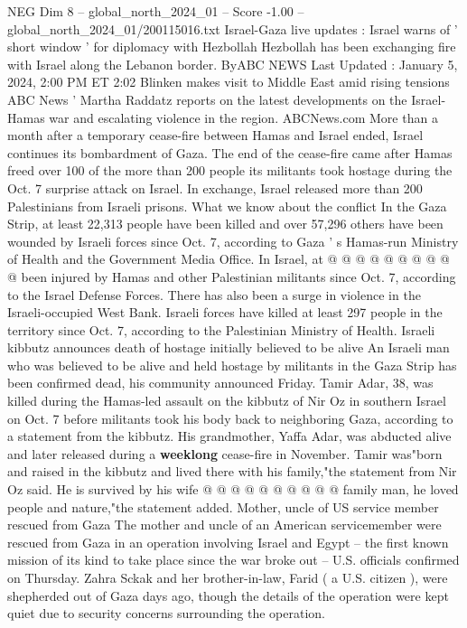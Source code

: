\begin{textsample}{NEG Dim 8 – global\_north\_2024\_01 – Score -1.00 – global\_north\_2024\_01/200115016.txt}  \label{ex:f8_neg_212}
Israel-Gaza live updates : Israel warns of ' short window ' for diplomacy with Hezbollah Hezbollah has been exchanging fire with Israel along the Lebanon border.
ByABC NEWS Last Updated : January 5, 2024, 2:00 PM ET 2:02 Blinken makes visit to Middle East amid rising tensions ABC News ' Martha Raddatz reports on the latest developments on the Israel-Hamas war and escalating violence in the region.
ABCNews.com More than a month after a temporary cease-fire between Hamas and Israel ended, Israel continues its bombardment of Gaza.
The end of the cease-fire came after Hamas freed over 100 of the more than 200 people its militants took hostage during the Oct. 7 surprise attack on Israel.
In exchange, Israel released more than 200 Palestinians from Israeli prisons.
What we know about the conflict In the Gaza Strip, at least 22,313 people have been killed and over 57,296 others have been wounded by Israeli forces since Oct. 7, according to Gaza ' s Hamas-run Ministry of Health and the Government Media Office.
In Israel, at @ @ @ @ @ @ @ @ @ @ been injured by Hamas and other Palestinian militants since Oct. 7, according to the Israel Defense Forces.
There has also been a surge in violence in the Israeli-occupied West Bank.
Israeli forces have killed at least 297 people in the territory since Oct. 7, according to the Palestinian Ministry of Health.
Israeli kibbutz announces death of hostage initially believed to be alive An Israeli man who was believed to be alive and held hostage by militants in the Gaza Strip has been confirmed dead, his community announced Friday.
Tamir Adar, 38, was killed during the Hamas-led assault on the kibbutz of Nir Oz in southern Israel on Oct. 7 before militants took his body back to neighboring Gaza, according to a statement from the kibbutz.
His grandmother, Yaffa Adar, was abducted alive and later released during a \textbf{weeklong} cease-fire in November.
Tamir was"born and raised in the kibbutz and lived there with his family,"the statement from Nir Oz said.
He is survived by his wife @ @ @ @ @ @ @ @ @ @ family man, he loved people and nature,"the statement added.
Mother, uncle of US service member rescued from Gaza The mother and uncle of an American servicemember were rescued from Gaza in an operation involving Israel and Egypt -- the first known mission of its kind to take place since the war broke out -- U.S. officials confirmed on Thursday.
Zahra Sckak and her brother-in-law, Farid ( a U.S. citizen ), were shepherded out of Gaza days ago, though the details of the operation were kept quiet due to security concerns surrounding the operation.

\end{textsample}
